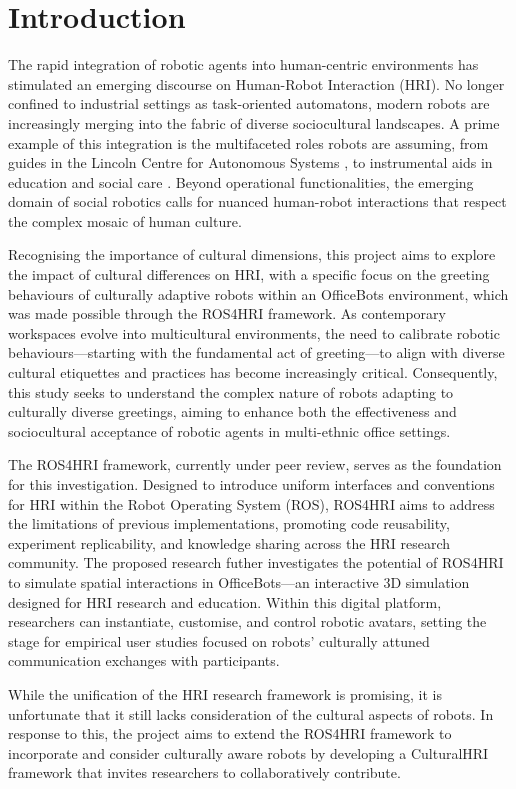 
\chapter{Introduction}

The rapid integration of robotic agents into human-centric environments has stimulated an emerging discourse on Human-Robot Interaction (HRI). No longer confined to industrial settings as task-oriented automatons, modern robots are increasingly merging into the fabric of diverse sociocultural landscapes. A prime example of this integration is the multifaceted roles robots are assuming, from guides in the Lincoln Centre for Autonomous Systems \cite{lincoln2018}, to instrumental aids in education and social care \cite{soriano2022}. Beyond operational functionalities, the emerging domain of social robotics calls for nuanced human-robot interactions that respect the complex mosaic of human culture.

Recognising the importance of cultural dimensions, this project aims to explore the impact of cultural differences on HRI, with a specific focus on the greeting behaviours of culturally adaptive robots within an OfficeBots environment, which was made possible through the ROS4HRI framework. As contemporary workspaces evolve into multicultural environments, the need to calibrate robotic behaviours---starting with the fundamental act of greeting---to align with diverse cultural etiquettes and practices has become increasingly critical. Consequently, this study seeks to understand the complex nature of robots adapting to culturally diverse greetings, aiming to enhance both the effectiveness and sociocultural acceptance of robotic agents in multi-ethnic office settings.

The ROS4HRI framework, currently under peer review, serves as the foundation for this investigation. Designed to introduce uniform interfaces and conventions for HRI within the Robot Operating System (ROS), ROS4HRI aims to address the limitations of previous implementations, promoting code reusability, experiment replicability, and knowledge sharing across the HRI research community. The proposed research futher investigates the potential of ROS4HRI to simulate spatial interactions in OfficeBots---an interactive 3D simulation designed for HRI research and education. Within this digital platform, researchers can instantiate, customise, and control robotic avatars, setting the stage for empirical user studies focused on robots' culturally attuned communication exchanges with participants.

While the unification of the HRI research framework is promising, it is unfortunate that it still lacks consideration of the cultural aspects of robots. In response to this, the project aims to extend the ROS4HRI framework to incorporate and consider culturally aware robots by developing a CulturalHRI framework that invites researchers to collaboratively contribute.